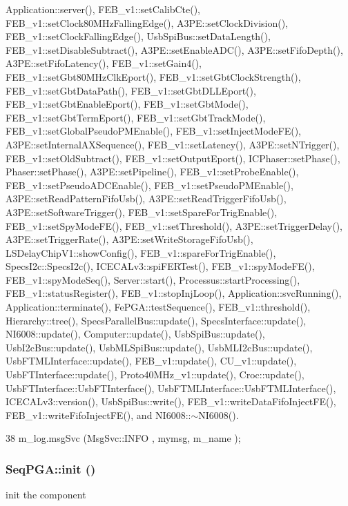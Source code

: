 Application::server(), FEB\_\-v1::setCalibCte(), FEB\_\-v1::setClock80MHzFallingEdge(), A3PE::setClockDivision(), FEB\_\-v1::setClockFallingEdge(), UsbSpiBus::setDataLength(), FEB\_\-v1::setDisableSubtract(), A3PE::setEnableADC(), A3PE::setFifoDepth(), A3PE::setFifoLatency(), FEB\_\-v1::setGain4(), FEB\_\-v1::setGbt80MHzClkEport(), FEB\_\-v1::setGbtClockStrength(), FEB\_\-v1::setGbtDataPath(), FEB\_\-v1::setGbtDLLEport(), FEB\_\-v1::setGbtEnableEport(), FEB\_\-v1::setGbtMode(), FEB\_\-v1::setGbtTermEport(), FEB\_\-v1::setGbtTrackMode(), FEB\_\-v1::setGlobalPseudoPMEnable(), FEB\_\-v1::setInjectModeFE(), A3PE::setInternalAXSequence(), FEB\_\-v1::setLatency(), A3PE::setNTrigger(), FEB\_\-v1::setOldSubtract(), FEB\_\-v1::setOutputEport(), ICPhaser::setPhase(), Phaser::setPhase(), A3PE::setPipeline(), FEB\_\-v1::setProbeEnable(), FEB\_\-v1::setPseudoADCEnable(), FEB\_\-v1::setPseudoPMEnable(), A3PE::setReadPatternFifoUsb(), A3PE::setReadTriggerFifoUsb(), A3PE::setSoftwareTrigger(), FEB\_\-v1::setSpareForTrigEnable(), FEB\_\-v1::setSpyModeFE(), FEB\_\-v1::setThreshold(), A3PE::setTriggerDelay(), A3PE::setTriggerRate(), A3PE::setWriteStorageFifoUsb(), LSDelayChipV1::showConfig(), FEB\_\-v1::spareForTrigEnable(), SpecsI2c::SpecsI2c(), ICECALv3::spiFERTest(), FEB\_\-v1::spyModeFE(), FEB\_\-v1::spyModeSeq(), Server::start(), Processus::startProcessing(), FEB\_\-v1::statusRegister(), FEB\_\-v1::stopInjLoop(), Application::svcRunning(), Application::terminate(), FePGA::testSequence(), FEB\_\-v1::threshold(), Hierarchy::tree(), SpecsParallelBus::update(), SpecsInterface::update(), NI6008::update(), Computer::update(), UsbSpiBus::update(), UsbI2cBus::update(), UsbMLSpiBus::update(), UsbMLI2cBus::update(), UsbFTMLInterface::update(), FEB\_\-v1::update(), CU\_\-v1::update(), UsbFTInterface::update(), Proto40MHz\_\-v1::update(), Croc::update(), UsbFTInterface::UsbFTInterface(), UsbFTMLInterface::UsbFTMLInterface(), ICECALv3::version(), UsbSpiBus::write(), FEB\_\-v1::writeDataFifoInjectFE(), FEB\_\-v1::writeFifoInjectFE(), and NI6008::$\sim$NI6008().


\begin{DoxyCode}
38 { m_log.msgSvc (MsgSvc::INFO    , mymsg, m_name ); }
\end{DoxyCode}
\hypertarget{classSeqPGA_aba1ead90de9e6f14042d8838db5ebe5b}{
\subsubsection[{init}]{ SeqPGA::init ()}}
\label{classSeqPGA_aba1ead90de9e6f14042d8838db5ebe5b}
init the component

